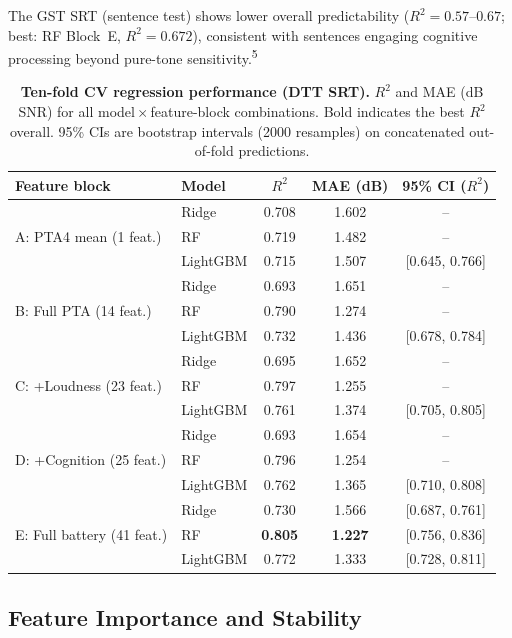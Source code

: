 \documentclass[12pt,a4paper]{article}
\begin{document}
The GST SRT (sentence test) shows lower overall predictability
($R^2{=}0.57$--$0.67$; best: RF Block~E, $R^2{=}0.672$), consistent with
sentences engaging cognitive processing beyond pure-tone
sensitivity.\textsuperscript{5}

\begin{table}[htbp]
\caption{\textbf{Ten-fold CV regression performance (DTT SRT).}
$R^2$ and MAE (dB SNR) for all model\,$\times$\,feature-block combinations.
Bold indicates the best $R^2$ overall.  95\% CIs are bootstrap intervals
(2000 resamples) on concatenated out-of-fold predictions.}
\label{tab:benchmark}
\centering\small
\begin{tabular}{llccc}
\toprule
Feature block & Model & $R^2$ & MAE (dB) & 95\% CI ($R^2$) \\
\midrule
\multirow{3}{*}{A: PTA4 mean (1 feat.)}
  & Ridge     & 0.708 & 1.602 & -- \\
  & RF        & 0.719 & 1.482 & -- \\
  & LightGBM  & 0.715 & 1.507 & [0.645, 0.766] \\
\midrule
\multirow{3}{*}{B: Full PTA (14 feat.)}
  & Ridge     & 0.693 & 1.651 & -- \\
  & RF        & 0.790 & 1.274 & -- \\
  & LightGBM  & 0.732 & 1.436 & [0.678, 0.784] \\
\midrule
\multirow{3}{*}{C: +Loudness (23 feat.)}
  & Ridge     & 0.695 & 1.652 & -- \\
  & RF        & 0.797 & 1.255 & -- \\
  & LightGBM  & 0.761 & 1.374 & [0.705, 0.805] \\
\midrule
\multirow{3}{*}{D: +Cognition (25 feat.)}
  & Ridge     & 0.693 & 1.654 & -- \\
  & RF        & 0.796 & 1.254 & -- \\
  & LightGBM  & 0.762 & 1.365 & [0.710, 0.808] \\
\midrule
\multirow{3}{*}{E: Full battery (41 feat.)}
  & Ridge     & 0.730 & 1.566 & [0.687, 0.761] \\
  & RF        & \textbf{0.805} & \textbf{1.227} & [0.756, 0.836] \\
  & LightGBM  & 0.772 & 1.333 & [0.728, 0.811] \\
\bottomrule
\end{tabular}
\end{table}

\subsection{Feature Importance and Stability}
\end{document}
